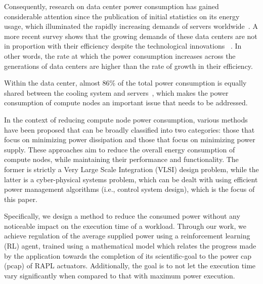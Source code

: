 Consequently, research on data center power consumption has gained considerable attention since the publication of initial statistics on its energy usage, which illuminated the rapidly increasing demands of servers worldwide~\cite{koomey2011growth}.
A more recent survey shows that the growing demands of these data centers are not in proportion with their efficiency despite the technological innovations ~\cite{koot2021usage}. In other words, the rate at which the power consumption increases across the generations of data centers are higher than the rate of growth in their efficiency. 

Within the data center, almost 86\% of the total power consumption is equally shared between the cooling system and servers~\cite{shehabi2016united}, which makes the power consumption of compute nodes an important issue that needs to be addressed. 

In the context of reducing compute node power consumption, various methods have been proposed that can be broadly classified into two categories: those that focus on minimizing power dissipation and those that focus on minimizing power supply. These approaches aim to reduce the overall energy consumption of compute nodes, while maintaining their performance and functionality.
The former is strictly a Very Large Scale Integration (VLSI) design problem, while the latter is a cyber-physical systems problem, which can be dealt with using efficient power management algorithms (i.e., control system design), which is the focus of this paper. 

Specifically, we design a method to reduce the consumed power without any noticeable impact on the execution time of a workload. Through our work, we achieve regulation of the average supplied power using a reinforcement learning (RL) agent, trained using a mathematical model which relates the progress made by the application towards the completion of its scientific-goal to the power cap (pcap) of RAPL actuators. Additionally, the goal is to not let the execution time vary significantly when compared to that with maximum power execution.



